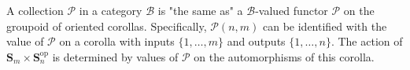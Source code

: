 A collection $\mathcal{P}$ in a category $\mathcal{B}$ is "the same as" a $\mathcal{B}$-valued functor $\mathcal{P}$ on the groupoid of oriented corollas. Specifically, $\mathcal{P}(n,m)$ can be identified with the value of $\mathcal{P}$ on a corolla with inputs $\{1, \ldots, m\}$ and outputs $\{1, \ldots, n\}$. The action of $\mathbf{S}_m \times \mathbf{S}_n^{\text{op}}$ is determined by values of $\mathcal{P}$ on the automorphisms of this corolla.
